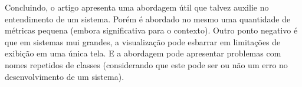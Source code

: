 Concluindo, o artigo apresenta uma abordagem útil que talvez auxilie no
entendimento de um sistema. Porém é abordado no mesmo uma quantidade de
métricas pequena (embora significativa para o contexto). Outro ponto negativo é
que em sistemas mui grandes, a visualização pode esbarrar em limitações de
exibição em uma única tela. E a abordagem pode apresentar problemas com nomes
repetidos de classes (considerando que este pode ser ou não um erro no
desenvolvimento de um sistema).
